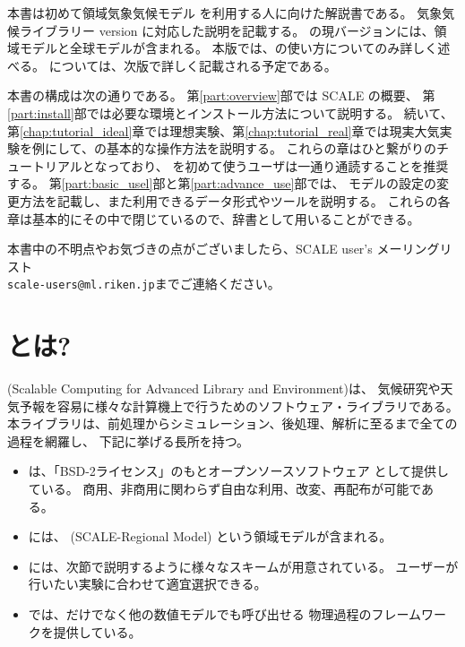 

本書は初めて領域気象気候モデル {\scalerm}
を利用する人に向けた解説書である。
気象気候ライブラリー{\scalelib}  version \version に対応した説明を記載する。
\scalelib の現バージョンには、領域モデル\scalerm と全球モデル\scalegm が含まれる。
本版では、\scalerm の使い方についてのみ詳しく述べる。
\scalegm については、次版で詳しく記載される予定である。

本書の構成は次の通りである。
第\ref{part:overview}部では SCALE の概要、
第\ref{part:install}部では必要な環境とインストール方法について説明する。
続いて、第\ref{chap:tutorial_ideal}章では理想実験、第\ref{chap:tutorial_real}章では現実大気実験を例にして、\scalerm の基本的な操作方法を説明する。
これらの章はひと繋がりのチュートリアルとなっており、
\scalerm を初めて使うユーザは一通り通読することを推奨する。
第\ref{part:basic_usel}部と第\ref{part:advance_use}部では、
モデルの設定の変更方法を記載し、また利用できるデータ形式やツールを説明する。
これらの各章は基本的にその中で閉じているので、辞書として用いることができる。

本書中の不明点やお気づきの点がございましたら、SCALE user's メーリングリスト\\
 \verb|scale-users@ml.riken.jp|までご連絡ください。



\section{\scalelib とは?} \label{subsec:scale_feature}

{\scalelib} (Scalable Computing for Advanced Library and Environment)は、
気候研究や天気予報を容易に様々な計算機上で行うためのソフトウェア・ライブラリである。
本ライブラリは、前処理からシミュレーション、後処理、解析に至るまで全ての過程を網羅し、
下記に挙げる長所を持つ。
\begin{itemize}
\item \scalelib は、「BSD-2ライセンス」のもとオープンソースソフトウェア
として提供している。
商用、非商用に関わらず自由な利用、改変、再配布が可能である。
\item \scalelib には、{\scalerm} (SCALE-Regional Model)
という領域モデルが含まれる。
\item \scalelib には、次節で説明するように様々なスキームが用意されている。
ユーザーが行いたい実験に合わせて適宜選択できる。
\item \scalelib では、\scalerm だけでなく他の数値モデルでも呼び出せる
物理過程のフレームワークを提供している。
\end{itemize}

